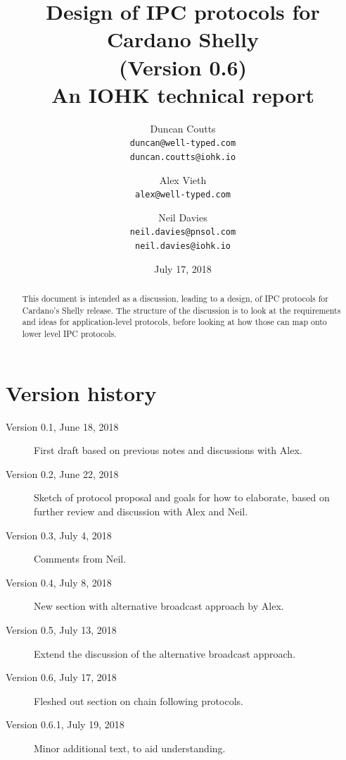 \documentclass{article}
\theoremstyle{definition}{
  \newtheorem{lemma}{Lemma}[section] %
  \newtheorem{definition}[lemma]{Definition}
}
\theoremstyle{theorem}{
  \newtheorem{invariant}[lemma]{Invariant}
  \newtheorem{proofobligation}[lemma]{Proof Obligation}
}
\numberwithin{equation}{lemma}
\begin{document}
\title{Design of IPC protocols for Cardano Shelly \\
       {\small (Version 0.6)} \\
       {\large \sc An IOHK technical report}}
\author{Duncan Coutts \\ {\small \texttt{duncan@well-typed.com}} \\
                         {\small \texttt{duncan.coutts@iohk.io}}
   \and Alex Vieth \\ {\small \texttt{alex@well-typed.com}}
   \and Neil Davies \\ {\small \texttt{neil.davies@pnsol.com}} \\
                       {\small \texttt{neil.davies@iohk.io}}
   }
\date{July 17, 2018}

\maketitle

\begin{abstract}
This document is intended as a discussion, leading to a design, of IPC
protocols for Cardano's Shelly release. The structure of the discussion is to
look at the requirements and ideas for application-level protocols, before
looking at how those can map onto lower level IPC protocols.
\end{abstract}

\tableofcontents

\section*{Version history}

\begin{description}
\item[Version 0.1, June 18, 2018] First draft based on previous notes and
                                  discussions with Alex.
\item[Version 0.2, June 22, 2018] Sketch of protocol proposal and goals for
                                  how to elaborate, based on further review
                                  and discussion with Alex and Neil.
\item[Version 0.3, July 4, 2018]  Comments from Neil.
\item[Version 0.4, July 8, 2018]  New section with alternative broadcast approach by Alex.
\item[Version 0.5, July 13, 2018] Extend the discussion of the alternative broadcast approach.
\item[Version 0.6, July 17, 2018] Fleshed out section on chain following protocols.
\item[Version 0.6.1, July 19, 2018] Minor additional text, to aid understanding.
\end{description}
\end{document}
